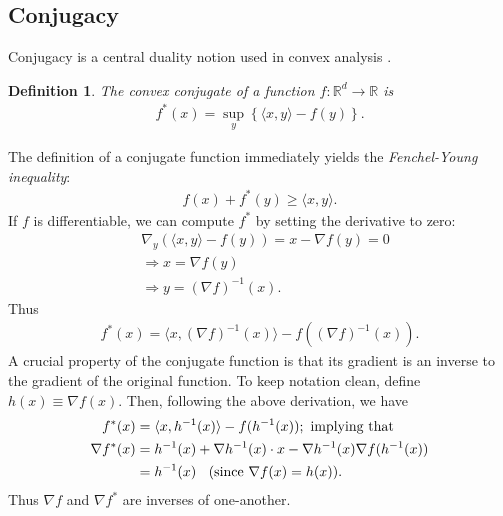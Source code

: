 \documentclass{article}
\newtheorem{define}{Definition}
\newcommand{\R}{\mathbb{R}}
\begin{document}
\subsection{Conjugacy} \label{sec:conjugate}
Conjugacy is a central duality notion used in convex analysis \cite{r.70}.
\begin{define}
The \emph{convex conjugate} of a function $f: \R^d\rightarrow \R$ is
\begin{align*}
f^*(x) = \sup_y \left\{\langle x,y \rangle - f(y) \right\}.
\end{align*}
\end{define}
The definition of a conjugate function immediately yields the 
\emph{Fenchel-Young inequality}:
\begin{align*}
f(x) + f^*(y) \geq \langle x,y \rangle.
\end{align*}
If $f$ is differentiable, we can compute $f^*$ by setting the
derivative to zero:
\begin{align*}
&\nabla_y \left( \langle x,y \rangle - f(y) \right)  = x - \nabla f(y)
= 0\\
&\Longrightarrow x = \nabla f(y)\\
&\Longrightarrow y = (\nabla f)^{-1}(x).
\end{align*}
Thus
\begin{align}
f^*(x) = \langle x, (\nabla f)^{-1}(x) \rangle - f( (\nabla
f)^{-1}(x)). \label{eq:conjdef}
\end{align}
A crucial property of the conjugate function is that its gradient
is an inverse to the gradient of the original function.  To keep
notation clean, define $h(x) \equiv \nabla f(x)$.  Then, following the
above derivation, we have
\begin{align*}
f^*(x) &= \langle x,h^{-1}(x) \rangle - f(h^{-1}(x)); \mbox{ implying
  that }\\
\nabla f^*(x) &= h^{-1}(x) + \nabla h^{-1}(x) \cdot x - \nabla
h^{-1}(x) \nabla f(h^{-1}(x))\\
&=h^{-1}(x)\mbox{\;\; (since }\nabla f(x) = h(x)).  
\end{align*}
Thus $\nabla f$ and $\nabla f^*$ are inverses of one-another.  
\end{document}
